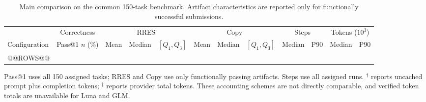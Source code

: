 \begin{table}[tbp]
  \caption{Main comparison on the common 150-task benchmark. Artifact
  characteristics are reported only for functionally successful submissions.}
  \label{tab:main}

  \centering
  \footnotesize
  \setlength{\tabcolsep}{2.2pt}
  \renewcommand{\arraystretch}{1.12}

  \begin{tabularx}{\linewidth}{@{}Xr rrr rrr rr rr@{}}
    \toprule

    &
    \multicolumn{1}{c}{Correctness} &
    \multicolumn{3}{c}{RRES} &
    \multicolumn{3}{c}{Copy} &
    \multicolumn{2}{c}{Steps} &
    \multicolumn{2}{c}{Tokens ($10^3$)} \\

    \cmidrule(lr){2-2}
    \cmidrule(lr){3-5}
    \cmidrule(lr){6-8}
    \cmidrule(lr){9-10}
    \cmidrule(lr){11-12}

    Configuration
      & \shortstack{Pass@1\\$n$ (\%)}
      & Mean
      & Median
      & $[Q_1,Q_3]$
      & Mean
      & Median
      & $[Q_1,Q_3]$
      & Median
      & P90
      & Median
      & P90 \\

    \midrule
@@ROWS@@


    \bottomrule
  \end{tabularx}

  \par\smallskip
  \begin{minipage}{\linewidth}
    \footnotesize
    Pass@1 uses all 150 assigned tasks; RRES and Copy use only functionally
    passing artifacts. Steps use all assigned runs. $^{\dagger}$ reports
    uncached prompt plus completion tokens; $^{\ddagger}$ reports provider total
    tokens. These accounting schemes are not directly comparable, and verified
    token totals are unavailable for Luna and GLM.
  \end{minipage}

\end{table}
